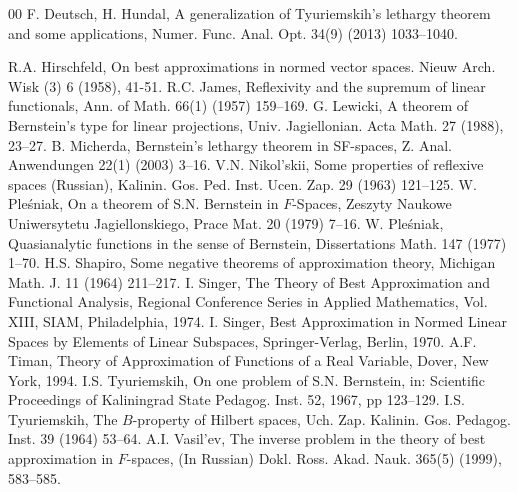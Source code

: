 \documentclass[12pt, reqno]{amsart}
\theoremstyle{definition}
\theoremstyle{remark}
\numberwithin{equation}{section}
\begin{document}
\begin{thebibliography}{00}
 F. Deutsch, H. Hundal, A generalization of Tyuriemskih's lethargy theorem  and some applications, Numer. Func. Anal. Opt. 34(9) (2013) 1033--1040.

  R.A. Hirschfeld, On best approximations in normed vector spaces. Nieuw Arch. Wisk (3) 6 (1958), 41-51.
 R.C. James, Reflexivity and the supremum of linear functionals,  Ann. of Math. 66(1) (1957) 159--169.
     G. Lewicki, A theorem of Bernstein's type for linear projections, Univ. Jagiellonian. Acta Math. 27 (1988), 23--27.
 B. Micherda, Bernstein's lethargy theorem in SF-spaces, Z. Anal. Anwendungen 22(1) (2003) 3--16.
 V.N. Nikol'skii, Some properties of reflexive spaces (Russian), Kalinin. Gos. Ped. Inst. Ucen. Zap. 29 (1963) 121--125.
 W. Ple\'{s}niak, On a theorem of S.N. Bernstein in $F$-Spaces, Zeszyty Naukowe Uniwersytetu Jagiellonskiego, Prace Mat. 20 (1979) 7--16.
 W. Ple\'{s}niak, Quasianalytic functions in the sense of Bernstein, Dissertations Math. 147 (1977) 1--70.
 H.S. Shapiro, Some negative theorems of approximation theory, Michigan Math. J. 11 (1964) 211--217.
 I. Singer, The Theory of Best Approximation and Functional Analysis, Regional Conference Series in Applied Mathematics, Vol. XIII,  SIAM, Philadelphia, 1974.
 I. Singer, Best Approximation in Normed Linear Spaces by Elements of Linear Subspaces, Springer-Verlag, Berlin, 1970.
 A.F. Timan, Theory of Approximation of Functions of a Real Variable, Dover, New York, 1994.
 I.S. Tyuriemskih, On one problem of S.N. Bernstein, in: Scientific Proceedings of Kaliningrad State Pedagog. Inst. 52,  1967, pp 123--129.
  I.S. Tyuriemskih, The $B$-property of Hilbert spaces,  Uch. Zap. Kalinin. Gos. Pedagog. Inst. 39 (1964)  53--64.
 A.I. Vasil'ev, The inverse problem in the theory of best approximation in $F$-spaces, (In Russian) Dokl. Ross. Akad. Nauk. 365(5) (1999),  583--585.


\end{thebibliography}
\end{document}
